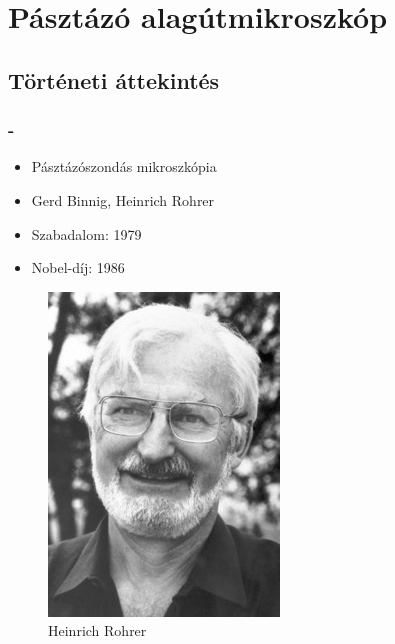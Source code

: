 \documentclass[aspectratio=169]{beamer}
\newcommand{\framet}{\frametitle{\secname{} - \subsecname}}
\begin{document}
\section{Pásztázó alagútmikroszkóp}
\subsection{Történeti áttekintés}
\begin{frame}
\framet
\begin{minipage}[m]{.63\textwidth}
\begin{itemize}
\item Pásztázószondás mikroszkópia
\item Gerd Binnig, Heinrich Rohrer
\item Szabadalom: 1979
\item Nobel-díj: 1986
\end{itemize}
\end{minipage}
\hfill
\begin{minipage}[m]{.36\linewidth}
\begin{figure}
\includegraphics[width=.7\textwidth]{rohrer.jpg}
\caption{Heinrich Rohrer}
\end{figure}
\end{minipage}
\end{frame}
\end{document}
